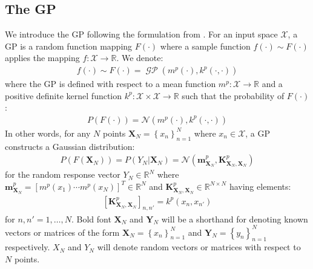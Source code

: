 \documentclass{article}
\newcommand{\GP}{\operatorname{\mathcal{GP}}}
\numberwithin{equation}{section}
\begin{document}
\subsection{The GP}\label{section:the-gp}
We introduce the GP following the formulation from \cite{rasmussen2003gaussian}. For an input space $\mathcal{X}$, a GP is a random function mapping $F(\cdot)$ where a sample function $f(\cdot) \sim F(\cdot)$ applies the mapping $f: \mathcal{X} \rightarrow \mathbb{R}$. We denote:
\begin{align}
    f(\cdot) \sim F(\cdot) = \GP\left(m^p(\cdot), k^p(\cdot, \cdot)\right)
    \label{gp}
\end{align}
where the GP is defined with respect to a mean function $m^p: \mathcal{X} \rightarrow \mathbb{R}$ and a positive definite kernel function $k^p: \mathcal{X} \times \mathcal{X} \rightarrow \mathbb{R}$ such that the probability of $F(\cdot)$:
\begin{align}
    P\left(F\left(\cdot \right)\right) =  \mathcal{N}(m^p(\cdot), k^p(\cdot, \cdot))
    \label{gp-normal}
\end{align}
In other words, for any $N$ points $\mathbf{X}_N = \left\{ x_n\right\}_{n=1}^N$ where $x_n \in \mathcal{X}$, a GP constructs a Gaussian distribution:
\begin{align}
    \label{gp-vector}
    P\left(F\left(\mathbf{X}_N\right)\right) = P\left(Y_N \vert \mathbf{X}_N\right) = \mathcal{N}\left(\mathbf{m}^p_{\mathbf{X}_N}, \mathbf{K}^{p}_{\mathbf{X}_N, \mathbf{X}_N}\right)
\end{align}
for the random response vector $Y_N \in \mathbb{R}^{N}$ where $\mathbf{m}^p_{\mathbf{X}_N} = \left[ m^p(x_1) \cdots m^p(x_N)\right]^T \in \mathbb{R}^N$ and $\mathbf{K}^p_{\mathbf{X}_N, \mathbf{X}_N} \in \mathbb{R}^{N \times N}$ having elements:
\begin{align}
    \left[\mathbf{K}^p_{\mathbf{X}_N, \mathbf{X}_N}\right]_{n, n'} = k^p(x_n, x_{n'})
\end{align}
for $n, n'=1,\dots, N$. Bold font $\mathbf{X}_N$ and $\mathbf{Y}_N$ will be a shorthand for denoting known vectors or matrices of the form $\mathbf{X}_N = \left\{ x_n\right\}_{n=1}^N$ and $\mathbf{Y}_N = \left\{ y_n\right\}_{n=1}^N$ respectively. $X_N$ and $Y_N$ will denote random vectors or matrices with respect to $N$ points.
\end{document}
